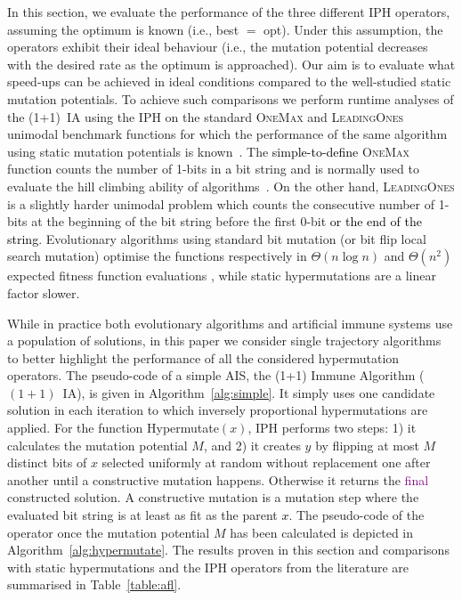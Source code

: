 \documentclass[lettersize,journal]{IEEEtran}
\newcommand{\new}[1]{\textcolor{black}{#1}}
\newcommand{\rev}[1]{\textcolor{black}{#1}}
\newcommand{\rerev}[1]{\textcolor{purple}{#1}}
\newcommand{\oneoneIA}{$(1+1)$~IA}
\newcommand{\IPHfcm}{IPH}
\begin{document}
In this section, we evaluate the performance of the three different \IPHfcm{} operators, assuming the optimum is known (i.e., best $=$ opt). Under this assumption, the operators exhibit their ideal behaviour (i.e., the mutation potential decreases with the desired rate as the optimum is approached).
Our aim is to evaluate what speed-ups can be achieved in ideal conditions compared to the well-studied static mutation potentials. To achieve such comparisons we perform runtime analyses of the (1+1)~IA  using the \IPHfcm{} on the standard \textsc{OneMax} and \textsc{LeadingOnes} unimodal benchmark functions for which the performance of the same algorithm using static mutation potentials is known~\cite{CorusOlivetoYazdani2019TCS}. The \rev{simple-to-define} \textsc{OneMax} function counts the number of 1-bits in \new{a} bit string and is normally used to evaluate the hill climbing ability of algorithms~\cite{LehrTEVC2018,CorusOlivetoTEVCsteadyGA2017,CorusOlivetoAlgo2020,DoerrDoerrEbel2015}. On the other hand, \textsc{LeadingOnes} is a slightly harder unimodal problem which counts the consecutive number of 1-bits at the beginning of the bit string before the first 0-bit \rev{or the end of the string}. 
Evolutionary algorithms using standard bit mutation (or bit flip local search mutation) optimise the functions respectively in $\Theta(n \log n)$ and $\Theta(n^2)$ expected fitness function evaluations \cite{DrosteJansenWegener2002,BoettcherEtAl2010,DoerrEtAl2016B,LissovoiOlivetoWarwicker2020,DLOW2018}, while static hypermutations are a linear factor slower\cite{CorusOlivetoYazdani2019TCS}.

While in practice both evolutionary algorithms and artificial immune systems use a population of solutions, in this paper we consider single trajectory algorithms to better highlight the performance of all the considered hypermutation operators.
The pseudo-code of a simple AIS,  the (1+1) Immune Algorithm (\oneoneIA{}), is given in Algorithm~\ref{alg:simple}. It simply uses one candidate solution in each iteration to which inversely proportional hypermutations are applied. For the function Hypermutate$(x)$, \IPHfcm{} performs two steps: 
1) it calculates the mutation potential $M$, and 2) it creates $y$ by flipping at most $M$ distinct bits of $x$ selected uniformly at random without replacement one after another until a constructive mutation happens. Otherwise it returns the \rerev{final} constructed solution. A  constructive mutation is a mutation step where the evaluated bit string is at least as fit as the parent \new{$x$}. The pseudo-code of the operator once the mutation potential $M$ has been calculated is depicted in Algorithm~\ref{alg:hypermutate}.
The results proven in this section and comparisons with static hypermutations and the IPH operators from the literature are summarised in Table~\ref{table:afl}.
\end{document}

